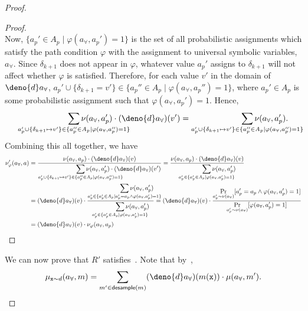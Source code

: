 \documentclass[acmsmall,review,anonymous]{acmart}\settopmatter{printfolios=true,printccs=false,printacmref=false}
\begin{document}
\begin{proof}
\begin{proof}
\[    \]
    Now, $\{a_p' \in \mathit{A}_p \mid \varphi(a_{\forall},a_p') = 1\}$ is the set of all probabilistic assignments which satisfy the path condition $\varphi$ with the assignment to universal symbolic variables, $a_{\forall}$. Since $\delta_{k+1}$ does not appear in $\varphi$, whatever value $a_p'$ assigns to $\delta_{k+1}$ will not affect whether $\varphi$ is satisfied. Therefore, for each value $v'$ in the domain of $\deno{d}a_{\forall}$, $a_p' \cup \{\delta_{k+1} = v'\} \in \{a_p'' \in \mathit{A}_p \mid \varphi(a_{\forall},a_p'') = 1\}$, where $a_p' \in \mathit{A}_p$ is some probabilistic assignment such that $\varphi(a_{\forall},a_p')=1$. Hence,
    \[
      \smashoperator[r]{\sum_{a_p' \cup \{\delta_{k+1} \mapsto v'\} \in \{a_p'' \in \mathit{A}_p \mid \varphi(a_{\forall},a_p'') = 1\}}} \nu(a_{\forall},a_p')\cdot(\deno{d}a_{\forall})(v')= \smashoperator[r]{\sum_{a_p' \cup \{\delta_{k+1} \mapsto v'\} \in \{a_p'' \in \mathit{A}_p \mid \varphi(a_{\forall},a_p'') = 1\}}} \nu(a_{\forall},a_p').
    \]
    Combining this all together, we have
    \begin{align*}
      \nu_{\varphi}'(a_{\forall}, a) &= \frac{\nu(a_{\forall},a_p)\cdot(\deno{d}a_{\forall})(v)}{\displaystyle \smashoperator[r]{\sum_{a_p' \cup \{\delta_{k+1} \mapsto v'\} \in \{a_p'' \in \mathit{A}_p \mid \varphi(a_{\forall},a_p'') = 1\}}}\nu(a_{\forall},a_p')\cdot(\deno{d}a_{\forall})(v')} = \frac{\nu(a_{\forall},a_p)\cdot(\deno{d}a_{\forall})(v)}{\displaystyle \smashoperator[r]{\sum_{a_p' \in \{a_p' \in \mathit{A}_p \mid \varphi(a_{\forall},a_p') = 1\}}} \nu(a_{\forall},a_p')}\\
                       &= (\deno{d}a_{\forall})(v) \cdot \frac{\displaystyle \smashoperator[r]{\sum_{a_p' \in \{a_p' \in \mathit{A}_p \mid a_p' = a_p \wedge \varphi(a_{\forall},a_p') = 1\}}}\nu(a_{\forall},a_p' )}{\displaystyle \smashoperator[r]{\sum_{a_p' \in \{a_p' \in \mathit{A}_p \mid \varphi(a_{\forall},a_p') = 1\}}} \nu(a_{\forall},a_p')}
                         = (\deno{d}a_{\forall})(v) \cdot \frac{\displaystyle\Pr_{a_p' \sim \nu(a_{\forall})}[a_p' = a_p \wedge \varphi(a_{\forall},a_p') = 1]}{\displaystyle\Pr_{a_p' \sim \nu(a_{\forall})}[\varphi(a_{\forall},a_p') = 1]}\\
                       &= (\deno{d}a_{\forall})(v) \cdot \nu_{\varphi}(a_{\forall},a_p)
    \end{align*}
  \end{proof}
  We can now prove that $R'$ satisfies~. Note that by~, 
  \[
    \mu_{\mathtt{x} \sim d}(a_{\forall},m) = \sum_{m' \in \mathsf{desample}(m)} (\deno{d}a_{\forall})(m(\mathtt{x})) \cdot \mu(a_{\forall},m').
\]
\end{proof}
\end{document}
